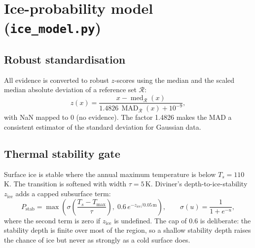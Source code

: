 \documentclass[11pt,a4paper]{article}
\newcommand{\code}[1]{\texttt{#1}}
\DeclareMathOperator{\MAD}{MAD}
\DeclareMathOperator{\med}{med}
\begin{document}
\section{Ice-probability model (\code{ice\_model.py})}

\subsection{Robust standardisation}
All evidence is converted to robust $z$-scores using the median and the scaled median absolute
deviation of a reference set $\mathcal{R}$:
\begin{equation}
  z(x) = \frac{x-\med_{\mathcal{R}}(x)}{1.4826\,\MAD_{\mathcal{R}}(x)+10^{-9}},
\end{equation}
with NaN mapped to $0$ (no evidence). The factor 1.4826 makes the MAD a consistent estimator of
the standard deviation for Gaussian data.

\subsection{Thermal stability gate}
Surface ice is stable where the annual maximum temperature is below $T_s=110$\,K. The
transition is softened with width $\tau=5$\,K. Diviner's depth-to-ice-stability $z_{\mathrm{ice}}$
adds a capped subsurface term:
\begin{equation}
  P_{\mathrm{stab}} = \max\!\left(\sigma\!\left(\frac{T_s-T_{\max}}{\tau}\right),\;
  0.6\,e^{-z_{\mathrm{ice}}/0.05\,\mathrm{m}}\right),
  \qquad \sigma(u)=\frac1{1+e^{-u}},
\end{equation}
where the second term is zero if $z_{\mathrm{ice}}$ is undefined. The cap of $0.6$ is deliberate:
the stability depth is finite over most of the region, so a shallow stability depth raises the
chance of ice but never as strongly as a cold surface does.
\end{document}
